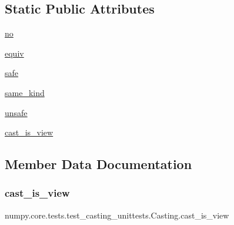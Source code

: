 \subsection*{Static Public Attributes}
\begin{DoxyCompactItemize}
\item 
\hyperlink{classnumpy_1_1core_1_1tests_1_1test__casting__unittests_1_1Casting_a3b19b40b828d18d4ff787477346a45d4}{no}
\item 
\hyperlink{classnumpy_1_1core_1_1tests_1_1test__casting__unittests_1_1Casting_ac08cf59b6c4f644affb1be173b21d701}{equiv}
\item 
\hyperlink{classnumpy_1_1core_1_1tests_1_1test__casting__unittests_1_1Casting_a6083e5ba957aea5c962c1eb6aee80238}{safe}
\item 
\hyperlink{classnumpy_1_1core_1_1tests_1_1test__casting__unittests_1_1Casting_ad2a0009c449b44181c12e63f121901bd}{same\+\_\+kind}
\item 
\hyperlink{classnumpy_1_1core_1_1tests_1_1test__casting__unittests_1_1Casting_ab13447118cd6ba950f27038ff2ad98dc}{unsafe}
\item 
\hyperlink{classnumpy_1_1core_1_1tests_1_1test__casting__unittests_1_1Casting_ae4ca6a29616a1873559d528a1af967a5}{cast\+\_\+is\+\_\+view}
\end{DoxyCompactItemize}


\subsection{Member Data Documentation}
\mbox{\label{classnumpy_1_1core_1_1tests_1_1test__casting__unittests_1_1Casting_ae4ca6a29616a1873559d528a1af967a5}} 
\subsubsection{\texorpdfstring{cast\+\_\+is\+\_\+view}{cast\_is\_view}}
{\footnotesize\ttfamily numpy.\+core.\+tests.\+test\+\_\+casting\+\_\+unittests.\+Casting.\+cast\+\_\+is\+\_\+view\hspace{0.3cm}{\ttfamily [static]}}

